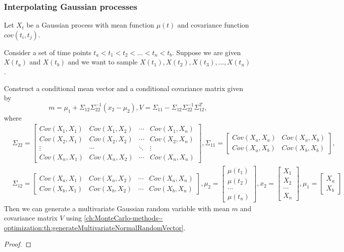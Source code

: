 \begin{refsection}
\subsubsection{Interpolating Gaussian processes}
\begin{method}
Let $X_t$ be a Gaussian process with mean function $\mu(t)$ and covariance function $cov(t_i,t_j)$. 

Consider a set of time points $t_a<t_1<t_2<... <t_n< t_b$. Suppose we are given $X(t_a)$ and $X(t_b)$ and we want to sample $X(t_1),X(t_2),X(t_3),...,X(t_n)$. 

Construct a conditional mean vector and a conditional covariance matrix  given by$$m = \mu_1 + \Sigma_{12}\Sigma_{22}^{-1}(x_2 - \mu_2), V = \Sigma_{11} - \Sigma_{12}\Sigma_{22}^{-1}\Sigma_{12}^T, $$
where 
\begin{align*}
&\Sigma_{22} = \begin{bmatrix}
Cov(X_1,X_1) & Cov(X_1,X_2) & \cdots & Cov(X_1,X_n)\\ 
Cov(X_2,X_1) & Cov(X_2,X_2) & \cdots & Cov(X_2,X_n)\\ 
\vdots & \cdots & \ddots & \vdots\\ 
Cov(X_n,X_1) & Cov(X_n,X_2) & \cdots & Cov(X_n,X_n) 
\end{bmatrix},\Sigma_{11} = \begin{bmatrix}
Cov(X_a,X_a) & Cov(X_a,X_b) \\
Cov(X_a,X_b) & Cov(X_b,X_b)  
\end{bmatrix}, \\
&\Sigma_{12} = \begin{bmatrix}
Cov(X_a,X_1) & Cov(X_a,X_2) & \cdots & Cov(X_a,X_n) \\
Cov(X_b,X_1) & Cov(X_b,X_2) & \cdots & Cov(X_b,X_n) 
\end{bmatrix}, \mu_2 = \begin{bmatrix}
\mu(t_1)\\
\mu(t_2)\\
\cdots \\
\mu(t_n)
\end{bmatrix},x_2 = \begin{bmatrix}
X_1\\
X_2\\
\cdots \\
X_n
\end{bmatrix},\mu_1 = \begin{bmatrix}
X_a\\
X_b
\end{bmatrix}
\end{align*}
Then we can generate a multivariate Gaussian random variable with mean $m$ and covariance matrix $V$ using \autoref{ch:MonteCarlo-methods--optimization:th:generateMultivariateNormalRandomVector}.	
\end{method}
\begin{proof}


\end{proof}
\end{refsection}
